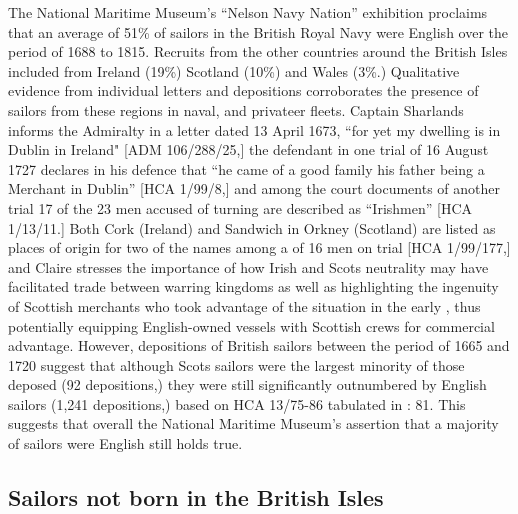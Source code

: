 The National Maritime Museum’s “Nelson Navy Nation” exhibition proclaims that an average of 51\% of sailors in the British Royal Navy were English over the period of 1688 to 1815. Recruits from the other countries around the British Isles included  from Ireland (19\%) Scotland (10\%) and Wales (3\%.) Qualitative evidence from individual letters and depositions corroborates the presence of sailors from these regions in naval,  and privateer fleets. Captain Sharlands informs the Admiralty in a letter dated 13 April {1673}, “for yet my dwelling is in Dublin in Ireland" [ADM 106/288/25,] the defendant in one trial of 16 August {1727} declares in his defence that “he came of a good family his father being a Merchant in Dublin” [HCA 1/99/8,] and among the court documents of another trial 17 of the 23 men accused of turning  are described as “Irishmen” [HCA 1/13/11.] Both Cork (Ireland) and Sandwich in Orkney (Scotland) are listed as places of origin for two of the names among a  of 16 men on trial [HCA 1/99/177,] and Claire \citet{McLoughlin2015} stresses the importance of how Irish and Scots neutrality may have facilitated trade between warring kingdoms as well as highlighting the ingenuity of Scottish merchants who took advantage of the situation in the early , thus potentially equipping English-owned vessels with Scottish crews for commercial advantage. However, depositions of British sailors between the period of 1665 and 1720 suggest that although Scots sailors were the largest minority of those deposed (92 depositions,) they were still significantly outnumbered by English sailors (1,241 depositions,) based on HCA 13/75-86 tabulated in \citealt{Earle1993}: 81. This suggests that overall the National Maritime Museum’s assertion that a majority of sailors were English still holds true.  

\subsection{{Sailors not born in the British Isles}}\label{sec:3.9.3}

